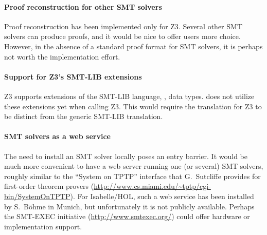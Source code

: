 \paragraph{Proof reconstruction for other SMT solvers}

Proof reconstruction has been implemented only for Z3.  Several other
SMT solvers can produce proofs, and it would be nice to offer \HOL{}
users more choice.  However, in the absence of a standard proof format
for SMT solvers, it is perhaps not worth the implementation effort.

\paragraph{Support for Z3's SMT-LIB extensions}

Z3 supports extensions of the SMT-LIB language, \eg, data types.
 does not utilize these extensions yet when calling Z3.
This would require the translation for Z3 to be distinct from the
generic SMT-LIB translation.

\paragraph{SMT solvers as a web service}

The need to install an SMT solver locally poses an entry barrier.  It
would be much more convenient to have a web server running one (or
several) SMT solvers, roughly similar to the ``System on TPTP''
interface that G.~Sutcliffe provides for first-order theorem provers
(\url{http://www.cs.miami.edu/~tptp/cgi-bin/SystemOnTPTP}).  For
Isabelle/HOL, such a web service has been installed by S.~B{\"o}hme in
Munich, but unfortunately it is not publicly available.  Perhaps the
SMT-EXEC initiative (\url{http://www.smtexec.org/}) could offer
hardware or implementation support.



